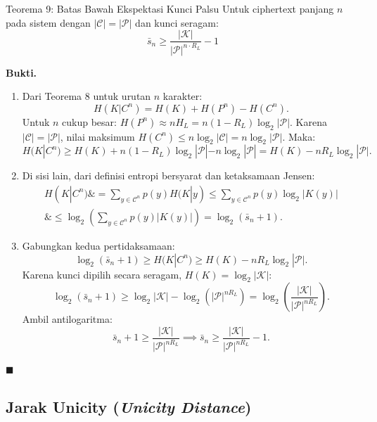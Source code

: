 \documentclass[11pt,a4paper]{article}
\newenvironment{proof}{\noindent\textbf{Bukti.}}{\hfill$\blacksquare$\vspace{0.3em}}
\begin{document}
\begin{thmbox}{Teorema 9: Batas Bawah Ekspektasi Kunci Palsu}
Untuk ciphertext panjang $n$ pada sistem dengan $|\mathcal{C}| = |\mathcal{P}|$ dan kunci seragam:
\begin{equation}
\label{eq:spurious_keys}
\bar{s}_n \ge \frac{|\mathcal{K}|}{|\mathcal{P}|^{n \cdot R_L}} - 1
\end{equation}
\end{thmbox}
\begin{proof}
\begin{enumerate}
    \item Dari Teorema 8 untuk urutan $n$ karakter:
    \[
    H(K|C^n) = H(K) + H(P^n) - H(C^n).
    \]
    Untuk $n$ cukup besar: $H(P^n) \approx n H_L = n(1 - R_L)\log_2 |\mathcal{P}|$.
    Karena $|\mathcal{C}| = |\mathcal{P}|$, nilai maksimum $H(C^n) \le n \log_2 |\mathcal{C}| = n \log_2 |\mathcal{P}|$.
    Maka:
    \begin{equation}
    \label{eq:proof_hkcn_ge}
    H(K|C^n) \ge H(K) + n(1 - R_L)\log_2 |\mathcal{P}| - n \log_2 |\mathcal{P}| = H(K) - n R_L \log_2 |\mathcal{P}|.
    \end{equation}
    \item Di sisi lain, dari definisi entropi bersyarat dan ketaksamaan Jensen:
    \begin{align*}
    H(K|C^n) \&= \sum_{y \in \mathcal{C}^n} p(y) H(K|y) \le \sum_{y \in \mathcal{C}^n} p(y) \log_2 |K(y)| \\
    \&\le \log_2\left( \sum_{y \in \mathcal{C}^n} p(y) |K(y)| \right) = \log_2(\bar{s}_n + 1).
    \end{align*}
    \item Gabungkan kedua pertidaksamaan:
    \[
    \log_2(\bar{s}_n + 1) \ge H(K|C^n) \ge H(K) - n R_L \log_2 |\mathcal{P}|.
    \]
    Karena kunci dipilih secara seragam, $H(K) = \log_2 |\mathcal{K}|$:
    \[
    \log_2(\bar{s}_n + 1) \ge \log_2 |\mathcal{K}| - \log_2\left( |\mathcal{P}|^{n R_L} \right) = \log_2\left( \frac{|\mathcal{K}|}{|\mathcal{P}|^{n R_L}} \right).
    \]
    Ambil antilogaritma:
    \[
    \bar{s}_n + 1 \ge \frac{|\mathcal{K}|}{|\mathcal{P}|^{n R_L}} \implies \bar{s}_n \ge \frac{|\mathcal{K}|}{|\mathcal{P}|^{n R_L}} - 1. 
    \]
\end{enumerate}
\end{proof}

\subsection{Jarak Unicity (\textit{Unicity Distance})}
\end{document}
